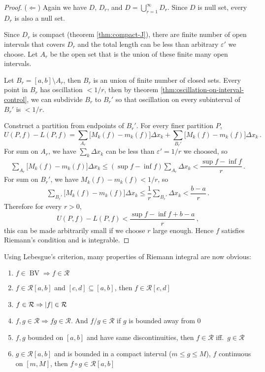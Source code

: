 \documentclass{article}
\newcommand{\Riemann}{\mathcal R}
\DeclarePairedDelimiter\abs{\lvert}{\rvert}
\DeclareMathOperator{\BV}{BV}
\begin{document}
\begin{proof}
    ($ \Leftarrow $)
    Again we have $ D $, $ D_r $, and $ D = \bigcup_{r=1}^\infty D_r $. Since $ D $ is null set, every $ D_r $ is also a null set.

    Since $ D_r $ is compact (theorem \ref{thm:compact-J}), there are finite number of open intervals that covers $ D_r $ and the total length can be less than arbitrary $ \varepsilon' $ we choose. Let $ A_r $ be the open set that is the union of these finite many open intervals. 
    
    Let $ B_r = [a, b] \setminus A_r $, then $ B_r $ is an union of finite number of closed sets. Every point in $ B_r $ has oscillation $ < 1/r $, then by theorem \ref{thm:oscillation-on-interval-control}, we can subdivide $ B_r $ to $ B_r' $ so that oscillation on every subinterval of $ B_r' $ is $ < 1/r $.

    Construct a partition from endpoints of $ B_r' $. For every finer partition $ P $,
    \[ 
        U(P, f) - L(P, f) = \sum_{A_r} \big[ M_k(f) - m_k(f) \big] \Delta x_k + \sum_{B_r'} \big[ M_k(f) - m_k(f) \big] \Delta x_k \,.
    \]
    For sum on $ A_r $, we have $ \sum_{k} \Delta x_k $ can be less than $ \varepsilon' = 1/r $ we choosed, so
    \begin{align*}
        \sum_{A_r} \big[ M_k(f) - m_k(f) \big] \Delta x_k \leqslant (\sup f - \inf f) \sum_{A_r} \Delta x_k < \dfrac{\sup f - \inf f}{r} \,.
    \end{align*}
    For sum on $ B_r' $, we have $ M_k(f) - m_k(f) < 1 / r $, so
    \begin{align*}
        \sum_{B_r'} \big[ M_k(f) - m_k(f) \big] \Delta x_k \leqslant \dfrac{1}{r} \sum_{B_r'} \Delta x_k < \dfrac{b - a}{r} \,.
    \end{align*}
    Therefore for every $ r > 0 $,
    \[ 
        U(P, f) - L(P, f) < \dfrac{\sup f - \inf f + b - a}{r} \,,
    \]
    this can be made arbitrarily small if we choose $ r $ large enough. Hence $ f $ satisfies Riemann's condition and is integrable.
\end{proof}

Using Lebesgue's criterion, many properties of Riemann integral are now obvious:
\begin{enumerate}
    \item $ f \in \BV \Rightarrow f \in \Riemann $
    \item $ f \in \Riemann[a, b] $ and $ [c, d] \subseteq [a, b] $, then $ f \in \Riemann[c, d] $
    \item $ f \in \Riemann \Rightarrow \abs{ f } \in \Riemann $
    \item $ f, g \in \Riemann \Rightarrow fg \in \Riemann $. And $ f / g \in \Riemann $ if $ g $ is bounded away from $ 0 $
    \item $ f, g $ bounded on $ [a, b] $ and have same discontinuities, then $ f \in \Riemann $ iff.\ $ g \in \Riemann $
    \item $ g \in \Riemann[a, b] $ and is bounded in a compact interval ($ m \leqslant g \leqslant M $), $ f $ continuous on $ [m, M] $, then $ f \circ g \in \Riemann[a, b] $
\end{enumerate}
\end{document}
